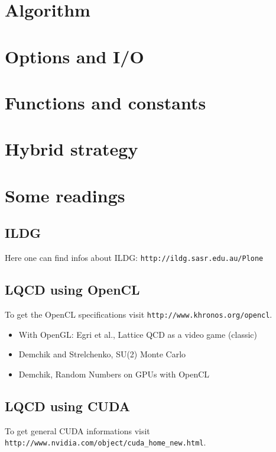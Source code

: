 \documentclass[a4paper,11pt]{article}
\newcommand{\url}[1]{\texttt{#1}}
\begin{document}
\section{Algorithm}


\section{Options and I/O}


\section{Functions and constants}


\section{Hybrid strategy}


\section{Some readings}
\subsection{ILDG}
Here one can find infos about ILDG: \url{http://ildg.sasr.edu.au/Plone}

\subsection{LQCD using OpenCL}
To get the OpenCL specifications visit \url{http://www.khronos.org/opencl}.

\begin{itemize}
\item With OpenGL: Egri et al., Lattice QCD as a video game \cite{Egri:2006zm} (classic)
\item Demchik and Strelchenko, SU(2) Monte Carlo \cite{Demchik:2009ni}
\item Demchik, Random Numbers on GPUs with OpenCL \cite{Demchik:2010}
\end{itemize}

\subsection{LQCD using CUDA}
To get general CUDA informations visit \url{http://www.nvidia.com/object/cuda\_home\_new.html}.
\end{document}
